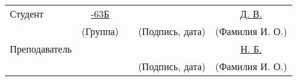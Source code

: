 \noindent
\begin{center}
\begin{tabular}{p{} p{} p{} p{} p{}} 
    Студент       & \multicolumn{1}{c}{\uline{7-63Б\hfill}} & & \uline{\hfill}                           & \multicolumn{1}{c}{\uline{ Д. В.\hfill}}   \\
                  & \multicolumn{1}{c}{\tiny(Группа)}               & & \multicolumn{1}{c}{\tiny(Подпись, дата)} & \multicolumn{1}{c}{\tiny(Фамилия И. О.)}                \\
    Преподаватель &                                                 & & \uline{\hfill}                           & \multicolumn{1}{c}{\uline{ Н. Б.\hfill}}   \\
                  &                                                 & & \multicolumn{1}{c}{\tiny(Подпись, дата)} & \multicolumn{1}{c}{\tiny(Фамилия И. О.)}                \\
\end{tabular}
\end{center}


\pagebreak

